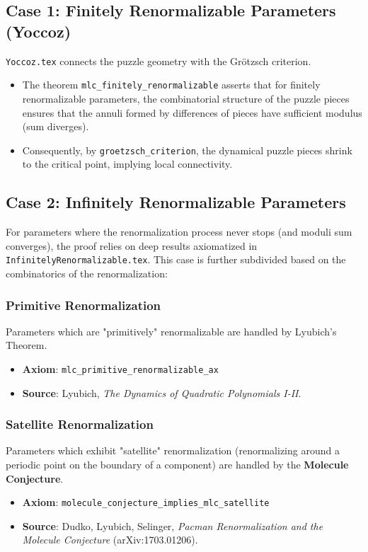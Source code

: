 \documentclass[reqno]{amsart}
\begin{document}
\subsection{Case 1: Finitely Renormalizable Parameters (Yoccoz)}
\texttt{Yoccoz.tex} connects the puzzle geometry with the Grötzsch criterion.
\begin{itemize}
    \item The theorem \texttt{mlc\_finitely\_renormalizable} asserts that for finitely renormalizable parameters, the combinatorial structure of the puzzle pieces ensures that the annuli formed by differences of pieces have sufficient modulus (sum diverges).
    \item Consequently, by \texttt{groetzsch\_criterion}, the dynamical puzzle pieces shrink to the critical point, implying local connectivity.
\end{itemize}

\subsection{Case 2: Infinitely Renormalizable Parameters}
For parameters where the renormalization process never stops (and moduli sum converges), the proof relies on deep results axiomatized in \texttt{InfinitelyRenormalizable.tex}. This case is further subdivided based on the combinatorics of the renormalization:

\subsubsection{Primitive Renormalization}
Parameters which are "primitively" renormalizable are handled by Lyubich's Theorem.
\begin{itemize}
    \item \textbf{Axiom}: \texttt{mlc\_primitive\_renormalizable\_ax}
    \item \textbf{Source}: Lyubich, \textit{The Dynamics of Quadratic Polynomials I-II}.
\end{itemize}

\subsubsection{Satellite Renormalization}
Parameters which exhibit "satellite" renormalization (renormalizing around a periodic point on the boundary of a component) are handled by the \textbf{Molecule Conjecture}.
\begin{itemize}
    \item \textbf{Axiom}: \texttt{molecule\_conjecture\_implies\_mlc\_satellite}
    \item \textbf{Source}: Dudko, Lyubich, Selinger, \textit{Pacman Renormalization and the Molecule Conjecture} (arXiv:1703.01206).
\end{itemize}
\end{document}
